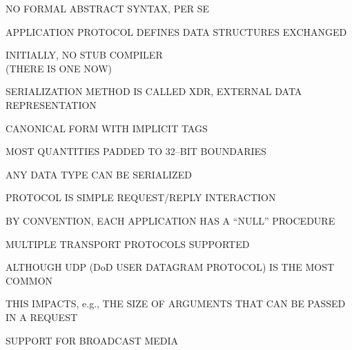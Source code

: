 \begin{bwslide}

\begin{nrtc}
\item	NO FORMAL ABSTRACT SYNTAX, PER SE
    \begin{nrtc}
    \item	APPLICATION PROTOCOL DEFINES DATA STRUCTURES EXCHANGED

    \item	INITIALLY, NO STUB COMPILER\\ (THERE IS ONE NOW)
    \end{nrtc}

\item	SERIALIZATION METHOD IS CALLED XDR, EXTERNAL DATA REPRESENTATION
    \begin{nrtc}
    \item	CANONICAL FORM WITH IMPLICIT TAGS

    \item	MOST QUANTITIES PADDED TO 32--BIT BOUNDARIES

    \item	ANY DATA TYPE CAN BE SERIALIZED
    \end{nrtc}
\end{nrtc}
\end{bwslide}


\begin{bwslide}

\begin{nrtc}
\item	PROTOCOL IS SIMPLE REQUEST/REPLY INTERACTION
    \begin{nrtc}
    \item	BY CONVENTION, EACH APPLICATION HAS A ``NULL'' PROCEDURE    
    \end{nrtc}

\item	MULTIPLE TRANSPORT PROTOCOLS SUPPORTED
    \begin{nrtc}
    \item	ALTHOUGH UDP (DoD USER DATAGRAM PROTOCOL) IS THE MOST COMMON

    \item	THIS IMPACTS, e.g., THE SIZE OF ARGUMENTS THAT CAN BE PASSED
		IN A REQUEST
    \end{nrtc}

\item	SUPPORT FOR BROADCAST MEDIA
\end{nrtc}
\end{bwslide}


